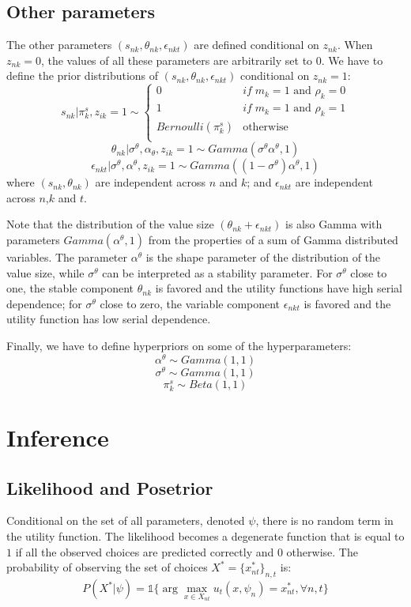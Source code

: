 \documentclass[12pt]{article}
\begin{document}
\subsection{Other parameters}

The other parameters $(s_{nk},\theta_{nk},\epsilon_{nkt})$ are defined conditional on $z_{nk}$. When $z_{nk}=0$, the values of all these parameters are arbitrarily set to $0$. We have to define the prior distributions of $(s_{nk},\theta_{nk},\epsilon_{nkt})$ conditional on $z_{nk}=1$:
$$ s_{nk}|\pi_k^s,z_{ik}=1 \sim \left\{ \begin{array}{cl}
0 & if \; m_k=1 \text{ and } \rho_k=0\\
1 & if \; m_k=1 \text{ and } \rho_k=1\\
Bernoulli(\pi_k^s) & \text{otherwise}\\
\end{array}\right.$$
$$ \theta_{nk}|\sigma^\theta,\alpha_\theta,z_{ik}=1 \sim Gamma(\sigma^\theta \alpha^\theta,1) $$
$$ \epsilon_{nkt}|\sigma^\theta,\alpha^\theta,z_{ik}=1 \sim Gamma((1-\sigma^\theta)\alpha^\theta,1) $$
where $(s_{nk},\theta_{nk})$ are independent across $n$ and $k$; and $\epsilon_{nkt}$ are independent across $n$,$k$ and $t$.

Note that the distribution of the value size $(\theta_{nk} + \epsilon_{nkt})$ is also Gamma with parameters $Gamma(\alpha^\theta,1)$ from the properties of a sum of Gamma distributed variables. The parameter $\alpha^\theta$ is the shape parameter of the distribution of the value size, while $\sigma^\theta$ can be interpreted as a stability parameter. 
For $\sigma^\theta$ close to one, the stable component $\theta_{nk}$ is favored and the utility functions have high serial dependence; for $\sigma^\theta$ close to zero, the variable component $\epsilon_{nkt}$ is favored and the utility function has low serial dependence.

Finally, we have to define hyperpriors on some of the hyperparameters:
$$\alpha^\theta \sim Gamma(1,1)$$
$$\sigma^\theta \sim Gamma(1,1)$$
$$ \pi_k^s \sim Beta(1,1) $$


\section{Inference}

\subsection{Likelihood and Posetrior} \label{sec:likelihood}
Conditional on the set of all parameters, denoted $\psi$, there is no random term in the utility function. The likelihood becomes a degenerate function that is equal to $1$ if all the observed choices are predicted correctly and $0$ otherwise. The probability of observing the set of choices $X^* = \{x_{nt}^*\}_{n,t}$ is: 
$$P(X^*|\psi) = \mathds{1}\{ \arg \max\limits_{x\in X_{nt}} u_t(x,\psi_n) = x_{nt}^*, \forall n,t \}$$
\end{document}
